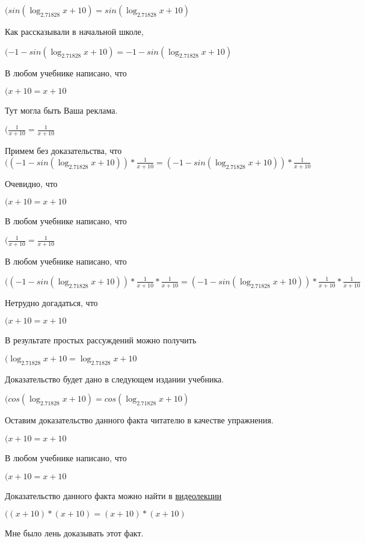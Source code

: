 \documentclass[12pt,a4paper,fleqn]{article}
\theoremstyle{definition}
\begin{document}
$(sin(\log_{ 2.71828 }{ x  +  10 }) = sin(\log_{ 2.71828 }{ x  +  10 })$

Как рассказывали в начальной школе,

$( -1  - sin(\log_{ 2.71828 }{ x  +  10 }) =  -1  - sin(\log_{ 2.71828 }{ x  +  10 })$

В любом учебнике написано, что

$( x  +  10  =  x  +  10 $

Тут могла быть Ваша реклама.

$(\frac{ 1 }{ x  +  10 }
 = \frac{ 1 }{ x  +  10 }
$

Примем без доказательства, что
$(( -1  - sin(\log_{ 2.71828 }{ x  +  10 })) * \frac{ 1 }{ x  +  10 }
 = ( -1  - sin(\log_{ 2.71828 }{ x  +  10 })) * \frac{ 1 }{ x  +  10 }
$

Очевидно, что

$( x  +  10  =  x  +  10 $

В любом учебнике написано, что

$(\frac{ 1 }{ x  +  10 }
 = \frac{ 1 }{ x  +  10 }
$

В любом учебнике написано, что

$(( -1  - sin(\log_{ 2.71828 }{ x  +  10 })) * \frac{ 1 }{ x  +  10 }
 * \frac{ 1 }{ x  +  10 }
 = ( -1  - sin(\log_{ 2.71828 }{ x  +  10 })) * \frac{ 1 }{ x  +  10 }
 * \frac{ 1 }{ x  +  10 }
$

Нетрудно догадаться, что

$( x  +  10  =  x  +  10 $

В результате простых рассуждений можно получить

$(\log_{ 2.71828 }{ x  +  10 } = \log_{ 2.71828 }{ x  +  10 }$

Доказательство будет дано в следующем издании учебника.

$(cos(\log_{ 2.71828 }{ x  +  10 }) = cos(\log_{ 2.71828 }{ x  +  10 })$

Оставим доказательство данного факта читателю в качестве упражнения.

$( x  +  10  =  x  +  10 $

В любом учебнике написано, что

$( x  +  10  =  x  +  10 $

Доказательство данного факта можно найти в \href{https://www.youtube.com/watch?v=dQw4w9WgXcQ}{видеолекции}

$(( x  +  10 ) * ( x  +  10 ) = ( x  +  10 ) * ( x  +  10 )$

Мне было лень доказывать этот факт.
\end{document}
